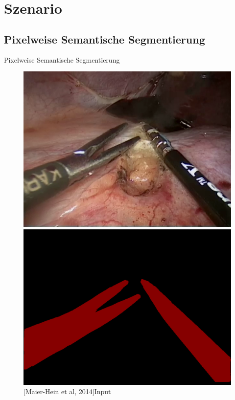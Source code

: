 
\section{Szenario}
\subsection{Pixelweise Semantische Segmentierung}
\begin{frame}{Pixelweise Semantische Segmentierung}
    \begin{figure}[ht]
        \begin{minipage}[b]{0.45\linewidth}
            \centering
            \includegraphics[width=\textwidth]{../images/img_35_raw.png}
            \caption{[Maier-Hein et al, 2014]\hspace{\textwidth}Input}
            \label{fig:input}
        \end{minipage}
        \hspace{0.5cm}
        \begin{minipage}[b]{0.45\linewidth}
            \centering
            \includegraphics[width=\textwidth]{../images/img_35_label.png}

\end{minipage}
\end{figure}
\end{frame}
